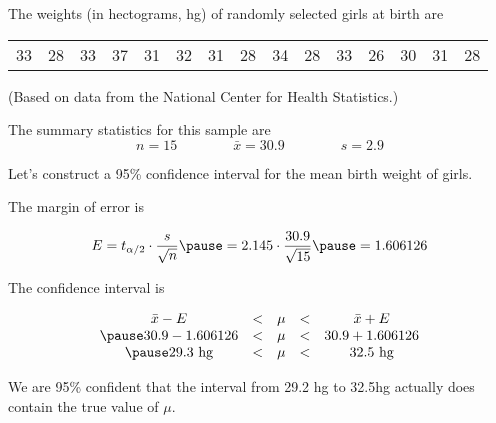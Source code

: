 \documentclass{beamer}
\begin{document}
\begin{frame}
\begin{example}
The weights (in hectograms, hg) of randomly selected girls at birth are

\vspace{-7mm}
\begin{center}
\begin{tabular}{ccccccccccccccc}
33 & 28 & 33 & 37 & 31 & 32 & 31 & 28 & 34 & 28 & 33 & 26 & 30 & 31 & 28
\end{tabular}
\end{center}

\vspace{-3mm}
(Based on data from the National Center for Health Statistics.)\pause

\vspace{1mm}
The summary statistics for this sample are
\vspace{-2mm}
\begin{equation*}
n = 15
\qquad\qquad \bar{x} = 30.9
\qquad\qquad s  = 2.9
\end{equation*}\pause

\vspace{-7mm}
Let's construct a 95\% confidence interval for the mean birth weight of girls.\pause

\vspace{1mm}
The margin of error is

\vspace{-3mm}
\begin{equation*}
E=t_{\alpha/2}\cdot\dfrac{s}{\sqrt{n}}\pause
=2.145\cdot\dfrac{30.9}{\sqrt{15}}\pause
=1.606126
\end{equation*}\pause

\vspace{-4mm}
The confidence interval is

\vspace{-3mm}
\begin{equation*}
\begin{matrix}
\bar{x} - E &<& \mu &<& \bar{x} + E\\\pause
30.9 - 1.606126 &<& \mu &<& 30.9 + 1.606126 \\\pause
29.3~\text{hg} &<& \mu &<& 32.5~\text{hg} \\
\end{matrix}
\end{equation*}\pause

\vspace{-3mm}
We are 95\% confident that the interval from 29.2 hg to 32.5hg actually does contain the true value of $\mu$.
\end{example}
\end{frame}
\end{document}
